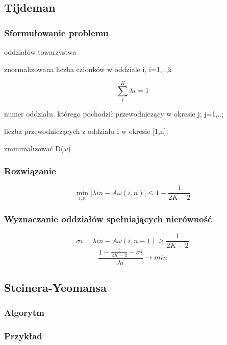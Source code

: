 \documentclass[12pt,a4paper]{article}
\begin{document}
\subsection{Tijdeman}
\subsubsection{Sformułowanie problemu}
\begin{description}
\item[k] oddziałów towarzystwa
\item[$\lambda$i] znormalizowana liczba członków w oddziale i, i=1,..,k
\item \begin{equation}
\sum \limits_{i}^{K} \lambda i = 1
\end{equation}
\item[$\omega$i] numer oddziału, którego pochodził przewodniczący w okresie j; j=1,..;
\item[A$\omega$(i,n)] liczba przewodniczących z oddziału i w okresie [1,n]; 
\item zminimalizować D($\omega$)=
\end{description}

\subsubsection{Rozwiązanie}
\begin{equation}
\min\limits_{i,n}\left | \lambda in - A\omega(i,n)\right | \leq 1-\frac{1}{2K-2}
\end{equation}
\subsubsection{Wyznaczanie oddziałów spełniających nierówność}
\begin{equation}
\sigma i = \lambda in - A\omega (i,n-1) \geq \frac{1}{2K-2}
\end{equation}
\begin{equation}
\frac{1-\frac{1}{2K-2}-\sigma i}{\lambda i} \to min
\end{equation}
\subsection{Steinera-Yeomansa}
\subsubsection{Algorytm}
\subsubsection{Przykład}
\end{document}
